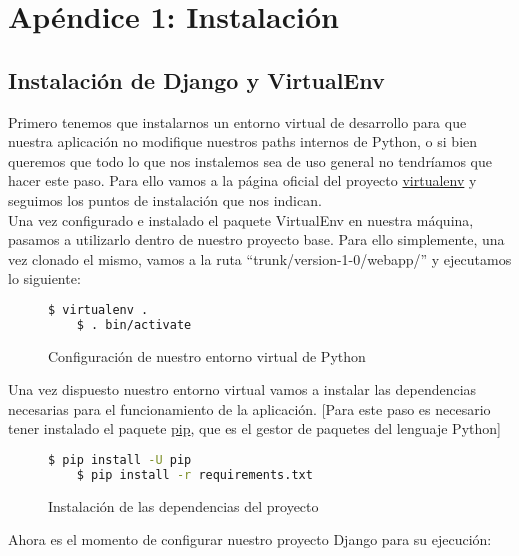\chapter{Apéndice 1: Instalación}
\label{chap:instalacion}

\section{Instalación de Django y VirtualEnv}

Primero tenemos que instalarnos un entorno virtual de desarrollo para que nuestra aplicación no modifique nuestros paths internos de Python, o si bien queremos que todo lo que nos instalemos sea de uso general no tendríamos que hacer este paso. Para ello vamos a la página oficial del proyecto \href{https://virtualenv.pypa.io/en/stable/installation/}{virtualenv} y seguimos los puntos de instalación que nos indican.\\

Una vez configurado e instalado el paquete VirtualEnv en nuestra máquina, pasamos a utilizarlo dentro de nuestro proyecto base. Para ello simplemente, una vez clonado el mismo, vamos a la ruta ``trunk/version-1-0/webapp/'' y ejecutamos lo siguiente:\\

\begin{figure}[H]
  \begin{lstlisting}[language=bash]
    $ virtualenv .
    $ . bin/activate
  \end{lstlisting}
  \caption{Configuración de nuestro entorno virtual de Python}
\end{figure}

Una vez dispuesto nuestro entorno virtual vamos a instalar las dependencias necesarias para el funcionamiento de la aplicación. [Para este paso es necesario tener instalado el paquete \href{https://pip.pypa.io/en/stable/installing/}{pip}, que es el gestor de paquetes del lenguaje Python]\\

\begin{figure}[H]
  \begin{lstlisting}[language=bash]
    $ pip install -U pip
    $ pip install -r requirements.txt
  \end{lstlisting}
  \caption{Instalación de las dependencias del proyecto}
\end{figure}

Ahora es el momento de configurar nuestro proyecto Django para su ejecución:

